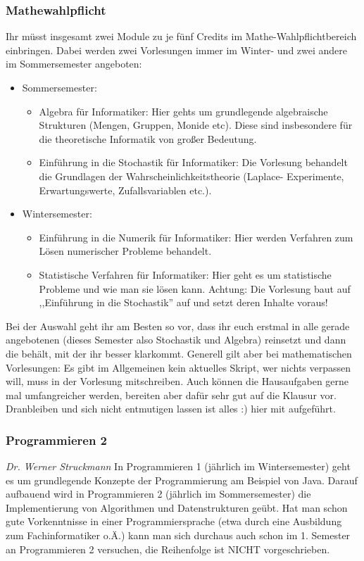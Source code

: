 \begin{multicols}{2}
\subsubsection{Mathewahlpflicht}
Ihr müsst insgesamt zwei Module zu je fünf Credits
	im Mathe-Wahlpflichtbereich einbringen. Dabei werden zwei
	Vorlesungen immer im Winter- und zwei andere im Sommersemester
	angeboten:
	\begin{itemize}
	  \item Sommersemester: 
	    \begin{itemize} 
	      \item Algebra für Informatiker: Hier gehts um grundlegende
		algebraische Strukturen (Mengen, Gruppen, Monide etc). Diese sind insbesondere für die
		theoretische Informatik von großer Bedeutung.
	      \item Einführung in die Stochastik für Informatiker: Die
		Vorlesung behandelt die Grundlagen der
		Wahrscheinlichkeitstheorie (Laplace- Experimente,
		Erwartungswerte, Zufallsvariablen etc.). 
	    \end{itemize}
	  \item Wintersemester: 
	    \begin{itemize}
	      \item Einführung in die Numerik für Informatiker: Hier
		werden Verfahren zum Lösen numerischer Probleme
		behandelt. 
	      \item Statistische Verfahren für Informatiker: Hier geht
		es um statistische Probleme und wie man sie lösen kann.
		Achtung: Die Vorlesung baut auf  ,,Einführung in
		die Stochastik'' auf und setzt deren Inhalte voraus!
	    \end{itemize}
	\end{itemize}
	Bei der Auswahl geht ihr am Besten so vor, dass ihr euch erstmal
	in alle gerade angebotenen (dieses Semester also Stochastik und
	Algebra) reinsetzt und dann die behält, mit der ihr besser
	klarkommt. Generell gilt aber bei mathematischen Vorlesungen: Es
	gibt im Allgemeinen kein aktuelles Skript, wer nichts verpassen
	will, muss in der Vorlesung mitschreiben. Auch können die
	Hausaufgaben gerne mal umfangreicher werden, bereiten aber dafür
	sehr gut auf die Klausur vor. Dranbleiben und sich nicht
	entmutigen lassen ist alles :)
	hier mit aufgeführt.
\subsubsection{Programmieren 2}
	\textit{Dr. Werner Struckmann}
	In Programmieren 1 (jährlich im Wintersemester) geht es um
	grundlegende Konzepte der Programmierung am Beispiel von Java.
	Darauf aufbauend wird in Programmieren 2 (jährlich im
	Sommersemester)  die Implementierung von Algorithmen und
	Datenstrukturen geübt. Hat man schon gute Vorkenntnisse in einer
	Programmiersprache (etwa durch eine Ausbildung zum
	Fachinformatiker o.Ä.) kann man sich durchaus auch schon im 1.
	Semester an Programmieren 2 versuchen, die Reihenfolge ist NICHT
	vorgeschrieben. 


\end{multicols}
